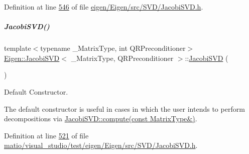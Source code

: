 Definition at line \hyperlink{eigen_2_eigen_2src_2_s_v_d_2_jacobi_s_v_d_8h_source_l00546}{546} of file \hyperlink{eigen_2_eigen_2src_2_s_v_d_2_jacobi_s_v_d_8h_source}{eigen/\+Eigen/src/\+S\+V\+D/\+Jacobi\+S\+V\+D.\+h}.

\mbox{\label{group___s_v_d___module_a55315ab9cd060019a5ad07be798ff3b9}} 
\subparagraph{\texorpdfstring{Jacobi\+S\+V\+D()}{JacobiSVD()}\hspace{0.1cm}{\footnotesize\ttfamily [4/6]}}
{\footnotesize\ttfamily template$<$typename \+\_\+\+Matrix\+Type, int Q\+R\+Preconditioner$>$ \\
\hyperlink{group___s_v_d___module_class_eigen_1_1_jacobi_s_v_d}{Eigen\+::\+Jacobi\+S\+VD}$<$ \+\_\+\+Matrix\+Type, Q\+R\+Preconditioner $>$\+::\hyperlink{group___s_v_d___module_class_eigen_1_1_jacobi_s_v_d}{Jacobi\+S\+VD} (\begin{DoxyParamCaption}{ }\end{DoxyParamCaption})\hspace{0.3cm}{\ttfamily [inline]}}



Default Constructor. 

The default constructor is useful in cases in which the user intends to perform decompositions via \hyperlink{group___s_v_d___module_acc7b9a4068cf7b69ae3227d217ed7efd}{Jacobi\+S\+V\+D\+::compute(const Matrix\+Type\&)}. 

Definition at line \hyperlink{matio_2visual__studio_2test_2eigen_2_eigen_2src_2_s_v_d_2_jacobi_s_v_d_8h_source_l00521}{521} of file \hyperlink{matio_2visual__studio_2test_2eigen_2_eigen_2src_2_s_v_d_2_jacobi_s_v_d_8h_source}{matio/visual\+\_\+studio/test/eigen/\+Eigen/src/\+S\+V\+D/\+Jacobi\+S\+V\+D.\+h}.

